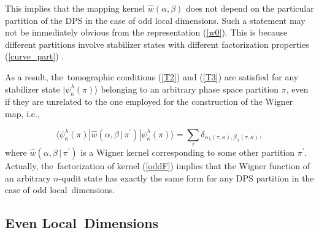 \documentclass[quantumrep,article,accept,pdftex,moreauthors]{Definitions/mdpi}
\begin{document}
This implies that the mapping kernel $\hat{w}\left( \alpha,\beta \right)$ does
not depend on the particular partition of the DPS in the case of odd local
dimensions. Such a statement may not be immediately obvious from the
representation (\ref{w0}). This is because different partitions involve
stabilizer states with different factorization properties (\ref{curve_part})
\cite{Bjork2007}.

As a result, the~tomographic conditions (\ref{T2}) and (\ref{T3}) are satisfied
for any stabilizer state $|\psi_{\kappa}^{\lambda}(\pi)\rangle$ belonging to
an arbitrary phase space partition $\pi $, even if they are unrelated to the one
employed for the construction of the Wigner map, i.e.,

\begin{equation*}
  \langle \psi_{\kappa}^{\lambda}(\pi) |\hat{w} \left(
    \alpha,\beta \, | \, \pi^{\prime}
  \right) |\psi_{\kappa}^{\lambda}(\pi)\rangle
  = \sum_{\tau} \delta_{\alpha_{\lambda}(\tau,\kappa),\beta_{\lambda}(\tau,\kappa)},
\end{equation*}
where $\hat{w}\left( \alpha,\beta \,|\,\pi^{\prime}\right) $ is a Wigner kernel
corresponding to some other partition $\pi^{\prime}$.  Actually, the~factorization of  kernel (\ref{oddF}) implies that the Wigner function of an
arbitrary $n$-qudit state has exactly the same form for any DPS partition in the
case of odd local~dimensions.

\subsection{Even Local~Dimensions}
\end{document}
